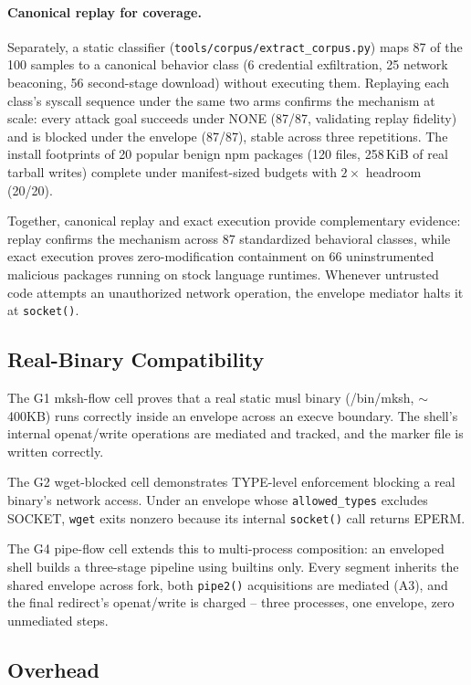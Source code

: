 \documentclass[letterpaper,twocolumn,10pt]{article}
\begin{document}
\paragraph{Canonical replay for coverage.}
Separately, a static classifier
(\texttt{tools/corpus/extract\_corpus.py}) maps 87 of the 100 samples to
a canonical behavior class (6 credential exfiltration, 25 network
beaconing, 56 second-stage download) without executing them.  Replaying
each class's syscall sequence under the same two arms confirms the
mechanism at scale: every attack goal succeeds under NONE (87/87,
validating replay fidelity) and is blocked under the envelope (87/87),
stable across three repetitions.  The install footprints of 20 popular
benign npm packages (120 files, 258\,KiB of real tarball writes)
complete under manifest-sized budgets with $2\times$ headroom (20/20).

Together, canonical replay and exact execution provide complementary
evidence: replay confirms the mechanism across 87 standardized behavioral
classes, while exact execution proves zero-modification containment on
66 uninstrumented malicious packages running on stock language runtimes.
Whenever untrusted code attempts an unauthorized network operation, the
envelope mediator halts it at \texttt{socket()}.

\subsection{Real-Binary Compatibility}

The G1 mksh-flow cell proves that a real static musl binary
(/bin/mksh, ${\sim}$400KB) runs correctly inside an envelope across
an execve boundary.  The shell's internal openat/write operations are
mediated and tracked, and the marker file is written correctly.

The G2 wget-blocked cell demonstrates TYPE-level enforcement blocking
a real binary's network access.  Under an envelope whose
\texttt{allowed\_types} excludes SOCKET, \texttt{wget} exits nonzero
because its internal \texttt{socket()} call returns EPERM.

The G4 pipe-flow cell extends this to multi-process composition: an
enveloped shell builds a three-stage pipeline using builtins only.
Every segment inherits the shared envelope across fork, both
\texttt{pipe2()} acquisitions are mediated (A3), and the final
redirect's openat/write is charged -- three processes, one envelope,
zero unmediated steps.

\subsection{Overhead}
\end{document}
